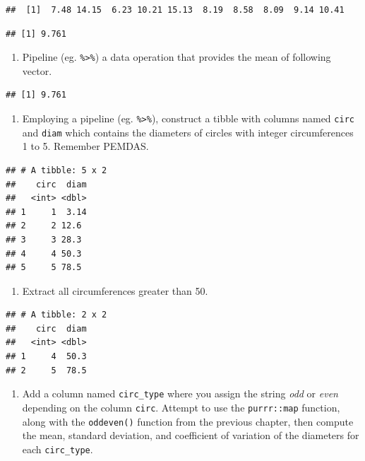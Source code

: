 \documentclass[
]{book}
\providecommand{\tightlist}{%
  \setlength{\itemsep}{0pt}\setlength{\parskip}{0pt}}
\begin{document}
\begin{verbatim}
##  [1]  7.48 14.15  6.23 10.21 15.13  8.19  8.58  8.09  9.14 10.41
\end{verbatim}

\begin{verbatim}
## [1] 9.761
\end{verbatim}

\begin{enumerate}
\def\labelenumi{\arabic{enumi}.}
\setcounter{enumi}{1}
\tightlist
\item
  Pipeline (eg. \texttt{\%\textgreater{}\%}) a data operation that provides the mean of following vector.
\end{enumerate}

\begin{verbatim}
## [1] 9.761
\end{verbatim}

\begin{enumerate}
\def\labelenumi{\arabic{enumi}.}
\setcounter{enumi}{1}
\tightlist
\item
  Employing a pipeline (eg. \texttt{\%\textgreater{}\%}), construct a tibble with columns named \texttt{circ} and \texttt{diam} which contains the diameters of circles with integer circumferences 1 to 5. Remember PEMDAS.
\end{enumerate}

\begin{verbatim}
## # A tibble: 5 x 2
##    circ  diam
##   <int> <dbl>
## 1     1  3.14
## 2     2 12.6 
## 3     3 28.3 
## 4     4 50.3 
## 5     5 78.5
\end{verbatim}

\begin{enumerate}
\def\labelenumi{\arabic{enumi}.}
\setcounter{enumi}{2}
\tightlist
\item
  Extract all circumferences greater than 50.
\end{enumerate}

\begin{verbatim}
## # A tibble: 2 x 2
##    circ  diam
##   <int> <dbl>
## 1     4  50.3
## 2     5  78.5
\end{verbatim}

\begin{enumerate}
\def\labelenumi{\arabic{enumi}.}
\setcounter{enumi}{3}
\tightlist
\item
  Add a column named \texttt{circ\_type} where you assign the string \emph{odd} or \emph{even} depending on the column \texttt{circ}. Attempt to use the \texttt{purrr::map} function, along with the \texttt{oddeven()} function from the previous chapter, then compute the mean, standard deviation, and coefficient of variation of the diameters for each \texttt{circ\_type}.
\end{enumerate}
\end{document}
